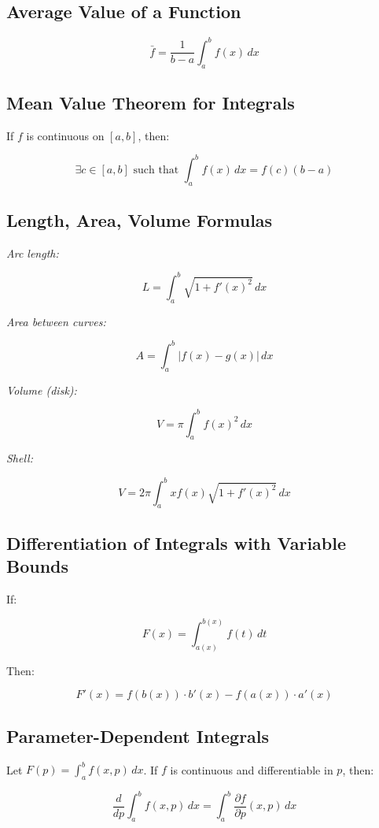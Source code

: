 \subsection{Average Value of a Function}

\[
    \bar{f} = \frac{1}{b - a} \int_a^b f(x)\,dx
\]

\subsection{Mean Value Theorem for Integrals}

If \(f\) is continuous on \([a, b]\), then:

\[
    \exists c \in [a, b] \text{ such that } \int_a^b f(x)\,dx = f(c)(b - a)
\]

\subsection{Length, Area, Volume Formulas}

\emph{Arc length:}

\[
    L = \int_a^b \sqrt{1 + {f'(x)}^2}\,dx
\]

\emph{Area between curves:}

\[
    A = \int_a^b |f(x) - g(x)|\,dx
\]

\emph{Volume (disk):}

\[
    V = \pi \int_a^b {f(x)}^2\,dx
\]

\emph{Shell:}

\[
    V = 2\pi \int_a^b x f(x) \sqrt{1 + {f'(x)}^2}\,dx
\]

\subsection{Differentiation of Integrals with Variable Bounds}

If:

\[
    F(x) = \int_{a(x)}^{b(x)} f(t)\,dt
\]

Then:

\[
    F'(x) = f(b(x)) \cdot b'(x) - f(a(x)) \cdot a'(x)
\]

\subsection{Parameter-Dependent Integrals}

Let \(F(p) = \int_a^b f(x, p)\,dx\). If \(f\) is continuous and differentiable in \(p\), then:

\[
    \frac{d}{dp} \int_a^b f(x, p)\,dx = \int_a^b \frac{\partial f}{\partial p}(x, p)\,dx
\]

